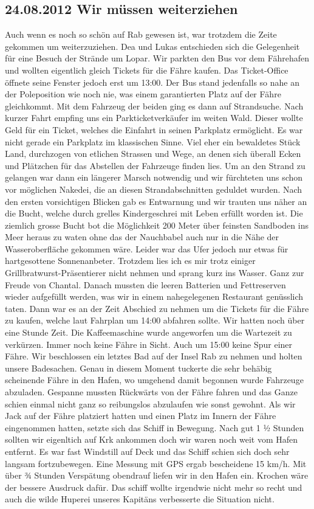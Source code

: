 \subsection{24.08.2012 Wir müssen weiterziehen}
Auch wenn es noch so schön auf Rab gewesen ist, war trotzdem die Zeite gekommen um weiterzuziehen.
Dea und Lukas entschieden sich die Gelegenheit für eine Besuch der Strände um Lopar.
Wir parkten den Bus vor dem Fährehafen und wollten eigentlich gleich Tickets für die Fähre kaufen.
Das Ticket-Office öffnete seine Fenster jedoch erst um 13:00.
Der Bus stand jedenfalls so nahe an der Poleposition wie noch nie, was einem garantierten Platz auf der Fähre gleichkommt.
Mit dem Fahrzeug der beiden ging es dann auf Strandsuche.
Nach kurzer Fahrt empfing uns ein Parkticketverkäufer im weiten Wald.
Dieser wollte Geld für ein Ticket, welches die Einfahrt in seinen Parkplatz ermöglicht.
Es war nicht gerade ein Parkplatz im klassischen Sinne.
Viel eher ein bewaldetes Stück Land, durchzogen von etlichen Strassen und Wege, an denen sich überall Ecken und Plätzchen für das Abstellen der Fahrzeuge finden lies.
Um an den Strand zu gelangen war dann ein längerer Marsch notwendig und wir fürchteten uns schon vor möglichen Nakedei, die an diesen Strandabschnitten geduldet wurden.
Nach den ersten vorsichtigen Blicken gab es Entwarnung und wir trauten uns näher an die Bucht, welche durch grelles Kindergeschrei mit Leben erfüllt worden ist.
Die ziemlich grosse Bucht bot die Möglichkeit 200 Meter über feinsten Sandboden ins Meer heraus zu waten ohne das der Nauchbabel auch nur in die Nähe der Wasseroberfläche gekommen wäre.
Leider war das Ufer jedoch nur etwas für hartgesottene Sonnenanbeter.
Trotzdem lies ich es mir trotz einiger Grillbratwurst-Präsentierer nicht nehmen und sprang kurz ins Wasser.
Ganz zur Freude von Chantal.
Danach mussten die leeren Batterien und Fettreserven wieder aufgefüllt werden, was wir in einem nahegelegenen Restaurant genüsslich taten.
Dann war es an der Zeit Abschied zu nehmen um die Tickets für die Fähre zu kaufen, welche laut Fahrplan um 14:00 abfahren sollte.
Wir hatten noch über eine Stunde Zeit.
Die Kaffeemaschine wurde angeworfen um die Wartezeit zu verkürzen.
Immer noch keine Fähre in Sicht.
Auch um 15:00 keine Spur einer Fähre.
Wir beschlossen ein letztes Bad auf der Insel Rab zu nehmen und holten unsere Badesachen.
Genau in diesem Moment tuckerte die sehr behäbig scheinende Fähre in den Hafen, wo umgehend damit begonnen wurde Fahrzeuge abzuladen.
Gespanne mussten Rückwärts von der Fähre fahren und das Ganze schien einmal nicht ganz so reibungslos abzulaufen wie sonst gewohnt.
Als wir Jack auf der Fähre platziert hatten und einen Platz im Innern der Fähre eingenommen hatten, setzte sich das Schiff in Bewegung.
Nach gut 1 ½ Stunden sollten wir eigenltich auf Krk ankommen doch wir waren noch weit vom Hafen entfernt.
Es war fast Windstill auf Deck und das Schiff schien sich doch sehr langsam fortzubewegen.
Eine Messung mit GPS ergab bescheidene 15 km/h.
Mit über ¾ Stunden Verspätung obendrauf liefen wir in den Hafen ein.
Krochen wäre der bessere Ausdruck dafür.
Das schiff wollte irgendwie nicht mehr so recht und auch die wilde Huperei unseres Kapitäns verbesserte die Situation nicht.

